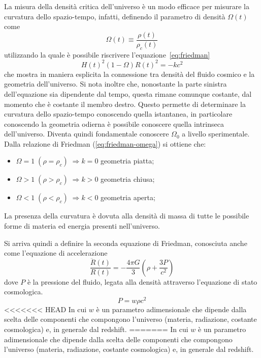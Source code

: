 La misura della densità critica dell'universo è un modo efficace per misurare la curvatura dello spazio-tempo, infatti, definendo il parametro di densità $\Omega(t)$ come
\begin{equation}\label{eq:parametro-densità}
    \Omega (t) \equiv  \frac{\rho (t)}{\rho_c (t)}
\end{equation}
utilizzando la quale è possibile riscrivere l'equazione~\ref{eq:friedman}
\begin{equation}\label{eq:friedman-omega}
    H(t)^2 (1-\Omega)R(t)^2 = -kc^2
\end{equation}
che mostra in maniera esplicita la connessione tra densità del fluido cosmico e la geometria dell'universo. Si nota inoltre che, nonostante la parte sinistra dell'equazione sia dipendente dal tempo, questa rimane comunque costante, dal momento che è costante il membro destro. Questo permette di determinare la curvatura dello spazio-tempo conoscendo quella istantanea, in particolare conoscendo la geometria odierna è possibile conoscere quella intrinseca dell'universo. Diventa quindi fondamentale conoscere $\Omega_0$ a livello sperimentale.
Dalla relazione di Friedman (\ref{eq:friedman-omega}) si ottiene che:
\begin{itemize}
    \item $\Omega = 1 \; (\rho = \rho_c)\; \Rightarrow k = 0$ geometria piatta;
    \item $\Omega > 1 \; (\rho > \rho_c)\; \Rightarrow k > 0$ geometria chiusa;
    \item $\Omega < 1 \; (\rho < \rho_c)\; \Rightarrow k < 0$ geometria aperta;
\end{itemize}
La presenza della curvatura è dovuta alla densità di massa di tutte le possibile forme di materia ed energia presenti nell'universo.

Si arriva quindi a definire la seconda equazione di Friedman, conosciuta anche come l'equazione di accelerazione
\begin{equation}\label{eq:second-friedman}
    \frac{\ddot{R}(t)}{R(t)} = - \frac{4\pi G}{3} \left( {\rho + \frac{3P}{c^2}} \right)
\end{equation}
dove $P$ è la pressione del fluido, legata alla densità attraverso l'equazione di stato cosmologica.
\begin{equation}\label{eq:equazione-stato-cosmologica}
    P = w \rho c^2
\end{equation}
<<<<<<< HEAD
In cui $w$ è un parametro adimensionale che dipende dalla scelta delle componenti che compongono l'universo (materia, radiazione, costante cosmologica) e, in generale dal redshift.
=======
In cui $w$ è un parametro adimensionale che dipende dalla scelta delle componenti che compongono l'universo (materia, radiazione, costante cosmologica) e, in generale dal redshift.
